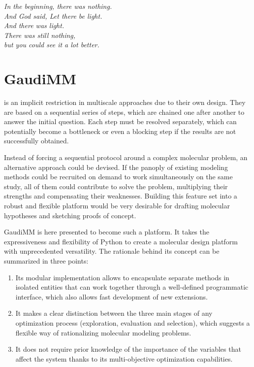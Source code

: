 \begin{savequote}[0.6\textwidth]
	\itshape In the beginning, there was nothing. \\
	\itshape And God said, Let there be light. \\
	\itshape And there was light. \\
	\itshape There was still nothing, \\
	\itshape but you could see it a lot better.
\end{savequote}

\chapter{GaudiMM}
\label{chap:04}


 is an implicit restriction in multiscale approaches due to their own design. They are based on a sequential series of steps, which are chained one after another to answer the initial question. Each step must be resolved separately, which can potentially become a bottleneck or even a blocking step if the results are not successfully obtained.


Instead of forcing a sequential protocol around a complex molecular problem, an alternative approach could be devised. If the panoply of existing modeling methods could be recruited on demand to work simultaneously on the same study, all of them could contribute to solve the problem, multiplying their strengths and compensating their weaknesses. Building this feature set into a robust and flexible platform would be very desirable for drafting molecular hypotheses and sketching proofs of concept.

GaudiMM is here presented to become such a platform. It takes the expressiveness and flexibility of Python to create a molecular design platform with unprecedented versatility. The rationale behind its concept can be summarized in three points:

\begin{enumerate}
	\item Its modular implementation allows to encapsulate separate methods in isolated entities that can work together through a well-defined programmatic interface, which also allows fast development of new extensions.

	\item It makes a clear distinction between the three main stages of any optimization process (exploration, evaluation and selection), which suggests a flexible way of rationalizing molecular modeling problems.

	\item It does not require prior knowledge of the importance of the variables that affect the system thanks to its multi-objective optimization capabilities.
\end{enumerate}

